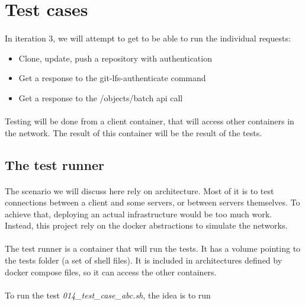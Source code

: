 \section{Test cases}

\paragraph{}
In iteration 3, we will attempt to get to be able to run the individual requests:

\begin{itemize}
    \item Clone, update, push a repository with authentication
    \item Get a response to the git-lfs-authenticate command
    \item Get a response to the /objects/batch api call
\end{itemize}

\paragraph{}
Testing will be done from a client container, that will access other containers in the network. The result of this container will be the result of the tests.

\subsection{The test runner}

\paragraph{}
The scenario we will discuss here rely on architecture. Most of it is to test connections between a client and some servers, or between servers themselves. To achieve that, deploying an actual infrastructure would be too much work. Instead, this project rely on the docker abstractions to simulate the networks.

\paragraph{}
The test runner is a container that will run the tests. It has a volume pointing to the tests folder (a set of shell files). It is included in architectures defined by docker compose files, so it can access the other containers.

\paragraph{}
To run the test \textit{014\_test\_case\_abc.sh}, the idea is to run

